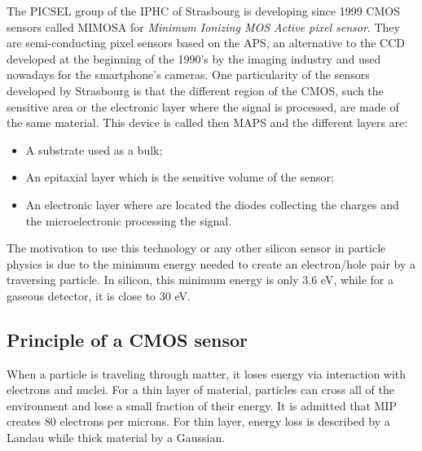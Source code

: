   The PICSEL group of the IPHC of Strasbourg is developing since 1999 CMOS sensors called MIMOSA for \textit{Minimum Ionizing MOS Active pixel sensor}. 
  They are semi-conducting pixel sensors based on the \gls{APS}, an alternative to the \gls{CCD} developed at the beginning of the 1990's by the imaging industry and used nowadays for the smartphone's cameras.
  One particularity of the sensors developed by Strasbourg is that the different region of the \gls{CMOS}, such the sensitive area or the electronic layer where the signal is processed, are made of the same material.
  This device is called then \gls{MAPS} and the different layers are:
  \begin{itemize}
    \item A substrate used as a bulk;
    \item An epitaxial layer which is the sensitive volume of the sensor;
    \item An electronic layer where are located the diodes collecting the charges and the microelectronic processing the signal.
  \end{itemize}

  The motivation to use this technology or any other silicon sensor in particle physics is due to the minimum energy needed to create an electron/hole pair by a traversing particle.
  In silicon, this minimum energy is only 3.6 eV, while for a gaseous detector, it is close to 30 eV.

  
    \subsection{Principle of a CMOS sensor}

    When a particle is traveling through matter, it loses energy via interaction with electrons and nuclei.
    For a thin layer of material, particles can cross all of the environment and lose a small fraction of their energy.
    It is admitted that \gls{MIP} creates 80 electrons per microns. 
    For thin layer, energy loss is described by a Landau while thick material by a Gaussian.

